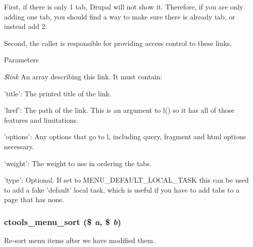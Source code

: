\begin{DoxyItemize}
\item First, if there is only 1 tab, Drupal will not show it. Therefore, if you are only adding one tab, you should find a way to make sure there is already tab, or instead add 2.
\item Second, the caller is responsible for providing access control to these links.
\end{DoxyItemize}


\begin{DoxyParams}{Parameters}
\item[{\em \$link}]An array describing this link. It must contain:
\begin{DoxyItemize}
\item 'title': The printed title of the link.
\item 'href': The path of the link. This is an argument to l() so it has all of those features and limitations.
\item 'options': Any options that go to l, including query, fragment and html options necessary.
\item 'weight': The weight to use in ordering the tabs.
\item 'type': Optional. If set to MENU\_\-DEFAULT\_\-LOCAL\_\-TASK this can be used to add a fake 'default' local task, which is useful if you have to add tabs to a page that has none. 
\end{DoxyItemize}\end{DoxyParams}
\hypertarget{menu_8inc_a4175eeb345ac720cbe0f27042cce1fa6}{
\subsubsection[{ctools\_\-menu\_\-sort}]{\setlength{\rightskip}{0pt plus 5cm}ctools\_\-menu\_\-sort (\$ {\em a}, \/  \$ {\em b})}}
\label{menu_8inc_a4175eeb345ac720cbe0f27042cce1fa6}
Re-\/sort menu items after we have modified them. 